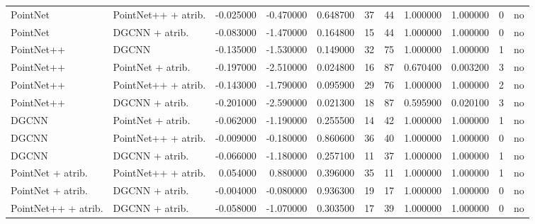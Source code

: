\begin{tabular}{llrrrrrrrrl}
PointNet & PointNet++ + atrib. & -0.025000 & -0.470000 & 0.648700 & 37 & 44 & 1.000000 & 1.000000 & 0 & no \\
PointNet & DGCNN + atrib. & -0.083000 & -1.470000 & 0.164800 & 15 & 44 & 1.000000 & 1.000000 & 0 & no \\
PointNet++ & DGCNN & -0.135000 & -1.530000 & 0.149000 & 32 & 75 & 1.000000 & 1.000000 & 1 & no \\
PointNet++ & PointNet + atrib. & -0.197000 & -2.510000 & 0.024800 & 16 & 87 & 0.670400 & 0.003200 & 3 & no \\
PointNet++ & PointNet++ + atrib. & -0.143000 & -1.790000 & 0.095900 & 29 & 76 & 1.000000 & 1.000000 & 2 & no \\
PointNet++ & DGCNN + atrib. & -0.201000 & -2.590000 & 0.021300 & 18 & 87 & 0.595900 & 0.020100 & 3 & no \\
DGCNN & PointNet + atrib. & -0.062000 & -1.190000 & 0.255500 & 14 & 42 & 1.000000 & 1.000000 & 1 & no \\
DGCNN & PointNet++ + atrib. & -0.009000 & -0.180000 & 0.860600 & 36 & 40 & 1.000000 & 1.000000 & 0 & no \\
DGCNN & DGCNN + atrib. & -0.066000 & -1.180000 & 0.257100 & 11 & 37 & 1.000000 & 1.000000 & 1 & no \\
PointNet + atrib. & PointNet++ + atrib. & 0.054000 & 0.880000 & 0.396000 & 35 & 11 & 1.000000 & 1.000000 & 1 & no \\
PointNet + atrib. & DGCNN + atrib. & -0.004000 & -0.080000 & 0.936300 & 19 & 17 & 1.000000 & 1.000000 & 0 & no \\
PointNet++ + atrib. & DGCNN + atrib. & -0.058000 & -1.070000 & 0.303500 & 17 & 39 & 1.000000 & 1.000000 & 0 & no \\
\bottomrule
\end{tabular}
